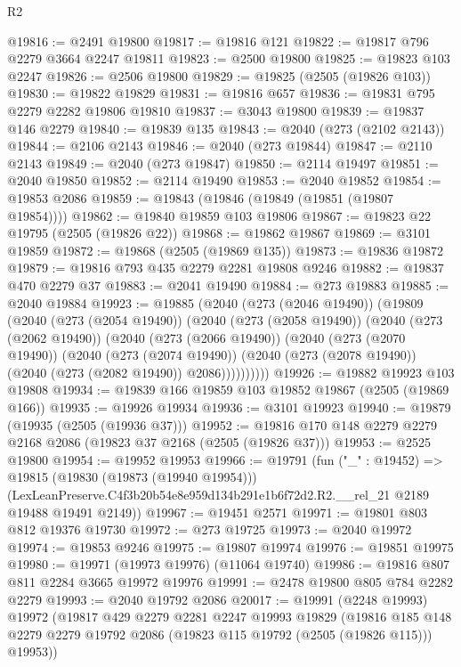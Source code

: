 \begin{lexlean}{R2}
\begin{coremodule}
@19816 := @2491 @19800
@19817 := @19816 @121
@19822 := @19817 @796 @2279 @3664 @2247 @19811
@19823 := @2500 @19800
@19825 := @19823 @103 @2247
@19826 := @2506 @19800
@19829 := @19825 (@2505 (@19826 @103))
@19830 := @19822 @19829
@19831 := @19816 @657
@19836 := @19831 @795 @2279 @2282 @19806 @19810
@19837 := @3043 @19800
@19839 := @19837 @146 @2279
@19840 := @19839 @135
@19843 := @2040 (@273 (@2102 @2143))
@19844 := @2106 @2143
@19846 := @2040 (@273 @19844)
@19847 := @2110 @2143
@19849 := @2040 (@273 @19847)
@19850 := @2114 @19497
@19851 := @2040 @19850
@19852 := @2114 @19490
@19853 := @2040 @19852
@19854 := @19853 @2086
@19859 := @19843 (@19846 (@19849 (@19851 (@19807 @19854))))
@19862 := @19840 @19859 @103 @19806
@19867 := @19823 @22 @19795 (@2505 (@19826 @22))
@19868 := @19862 @19867
@19869 := @3101 @19859
@19872 := @19868 (@2505 (@19869 @135))
@19873 := @19836 @19872
@19879 := @19816 @793 @435 @2279 @2281 @19808 @9246
@19882 := @19837 @470 @2279 @37
@19883 := @2041 @19490
@19884 := @273 @19883
@19885 := @2040 @19884
@19923 := @19885
    (@2040
      (@273 (@2046 @19490))
      (@19809
        (@2040
          (@273 (@2054 @19490))
          (@2040
            (@273 (@2058 @19490))
            (@2040
              (@273 (@2062 @19490))
              (@2040
                (@273 (@2066 @19490))
                (@2040
                  (@273 (@2070 @19490))
                  (@2040
                    (@273 (@2074 @19490))
                    (@2040 (@273 (@2078 @19490)) (@2040 (@273 (@2082 @19490)) @2086))))))))))
@19926 := @19882 @19923 @103 @19808
@19934 := @19839 @166 @19859 @103 @19852 @19867 (@2505 (@19869 @166))
@19935 := @19926 @19934
@19936 := @3101 @19923
@19940 := @19879 (@19935 (@2505 (@19936 @37)))
@19952 := @19816 @170 @148 @2279 @2279 @2168 @2086 (@19823 @37 @2168 (@2505 (@19826 @37)))
@19953 := @2525 @19800
@19954 := @19952 @19953
@19966 := @19791
    (fun ("_" : @19452) =>
    @19815
      (@19830 (@19873 (@19940 @19954)))
      (LexLeanPreserve.C4f3b20b54e8e959d134b291e1b6f72d2.R2.__rel_21 @2189 @19488 @19491 @2149))
@19967 := @19451 @2571
@19971 := @19801 @803 @812 @19376 @19730
@19972 := @273 @19725
@19973 := @2040 @19972
@19974 := @19853 @9246
@19975 := @19807 @19974
@19976 := @19851 @19975
@19980 := @19971 (@19973 @19976) (@11064 @19740)
@19986 := @19816 @807 @811 @2284 @3665 @19972 @19976
@19991 := @2478 @19800 @805 @784 @2282 @2279
@19993 := @2040 @19792 @2086
@20017 := @19991
    (@2248 @19993)
    @19972
    (@19817
      @429
      @2279
      @2281
      @2247
      @19993
      @19829
      (@19816 @185 @148 @2279 @2279 @19792 @2086 (@19823 @115 @19792 (@2505 (@19826 @115))) @19953))

\end{coremodule}
\end{lexlean}
